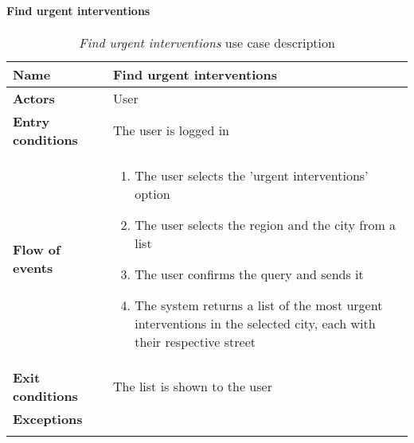 		\paragraph{Find urgent interventions}
		\begin{longtable}{p{0.25\linewidth}p{0.75\linewidth}}
			\toprule
			\textbf{Name} & \textbf{Find urgent interventions} \\
			\midrule
			\textbf{Actors} & User \\
			\midrule
			\textbf{Entry conditions} & The user is logged in \\
			\midrule
			\textbf{Flow of events} & 
			\begin{enumerate}
				\item The user selects the 'urgent interventions' option
				\item The user selects the region and the city from a list
				\item The user confirms the query and sends it
				\item The system returns a list of the most urgent interventions in the selected city, each with their respective street
			\end{enumerate} \\
			\midrule
			\textbf{Exit conditions} & The list is shown to the user\\
			\midrule
			\textbf{Exceptions} &  \\
			\bottomrule
			\caption{\emph{Find urgent interventions} use case description}
		\end{longtable}
	
